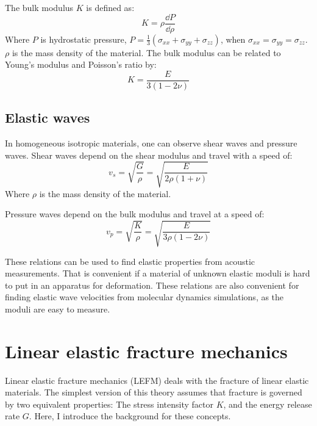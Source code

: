 The bulk modulus $K$ is defined as:
\begin{equation}
	K = \rho\frac{\dd P}{\dd \rho}
\end{equation}
Where $P$ is hydrostatic pressure, $P = \frac{1}{3} \left(\sigma_{xx}+\sigma_{yy}+\sigma_{zz}\right)$, when $\sigma_{xx} = \sigma_{yy} = \sigma_{zz}$. $\rho$ is the mass density of the material.
The bulk modulus can be related to Young's modulus and Poisson's ratio by:\begin{equation}
	K = \frac{E}{3(1-2\nu)}
\end{equation}

\subsection{Elastic waves}
In homogeneous isotropic materials, one can observe shear waves and pressure waves. Shear waves depend on the shear modulus and travel with a speed of:
\begin{equation}
	v_s = \sqrt{\frac{G}{\rho}} = \sqrt{\frac{E}{2\rho(1+\nu)}}
\end{equation}
Where $\rho$ is the mass density of the material.

Pressure waves depend on the bulk modulus and travel at a speed of:
\begin{equation}
	v_p = \sqrt{\frac{K}{\rho}} = \sqrt{\frac{E}{3\rho(1-2\nu)}}
\end{equation}

These relations can be used to find elastic properties from acoustic measurements. That is convenient if a material of unknown elastic moduli is hard to put in an apparatus for deformation. These relations are also convenient for finding elastic wave velocities from molecular dynamics simulations, as the moduli are easy to measure.


\section{Linear elastic fracture mechanics}
Linear elastic fracture mechanics (LEFM) deals with the fracture of linear elastic materials. The simplest version of this theory assumes that fracture is governed by two equivalent properties: The stress intensity factor $K$, and the energy release rate $G$. Here, I introduce the background for these concepts.

